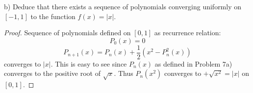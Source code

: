 \documentclass{article}
\begin{document}
\begin{tcolorbox}
b) Deduce that there exists a sequence of polynomials converging uniformly on $[-1, 1]$ to the function $f(x) = |x|$.
\end{tcolorbox}
\begin{proof}
Sequence of polynomials defined on $[0,1]$ as recurrence relation:
$$ P_0(x) = 0 $$ 
$$ P_{n+1}(x) = P_n(x) + \frac{1}{2} \left( x^2-P_n^2(x) \right) $$
converges to $|x|$. This is easy to see since $P_n(x)$ as defined in Problem 7a) converges to the positive root of $\sqrt{x}$. Thus $P_n(x^2)$ converges to $+\sqrt{x^2} = |x|$ on $[0,1]$.

\end{proof}
\end{document}
